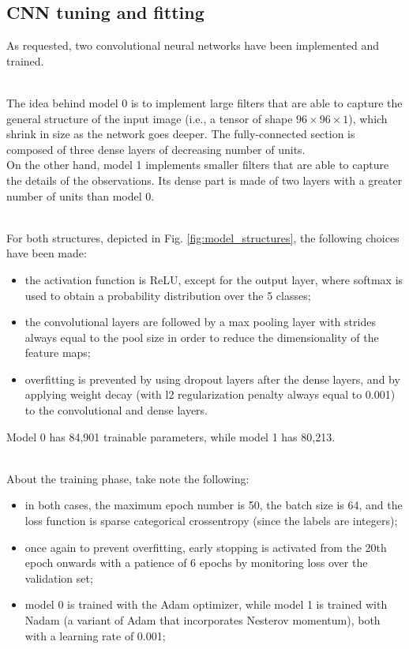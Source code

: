 \subsection{CNN tuning and fitting}
\label{sec:cnn_tuning_fitting}

\noindent As requested, two convolutional neural networks have been implemented and trained. 

\noindent \\The idea behind model 0 is to implement large filters that are able to capture the general structure of the input image (i.e., a tensor of shape $96 \times 96 \times 1$), which shrink in size as the network goes deeper. The fully-connected section is composed of three dense layers of decreasing number of units.
\\On the other hand, model 1 implements smaller filters that are able to capture the details of the observations. Its dense part is made of two layers with a greater number of units than model 0.

\noindent \\For both structures, depicted in Fig. \ref{fig:model_structures}, the following choices have been made:

\begin{itemize}
    \item the activation function is ReLU, except for the output layer, where softmax is used to obtain a probability distribution over the 5 classes;
    \item the convolutional layers are followed by a max pooling layer with strides always equal to the pool size in order to reduce the dimensionality of the feature maps;
    \item overfitting is prevented by using dropout layers after the dense layers, and by applying weight decay (with l2 regularization penalty always equal to 0.001) to the convolutional and dense layers.
\end{itemize}



\noindent Model 0 has 84,901 trainable parameters, while model 1 has 80,213.

\noindent \\About the training phase, take note the following:

\begin{itemize}
    \item in both cases, the maximum epoch number is 50, the batch size is 64, and the loss function is sparse categorical crossentropy (since the labels are integers);
    \item once again to prevent overfitting, early stopping is activated from the 20th epoch onwards with a patience of 6 epochs by monitoring loss over the validation set;
    \item model 0 is trained with the Adam optimizer, while model 1 is trained with Nadam (a variant of Adam that incorporates Nesterov momentum), both with a learning rate of 0.001;
\end{itemize}